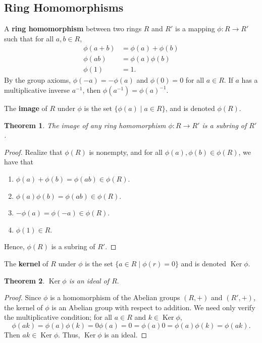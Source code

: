 \documentclass[11pt]{article}
\newtheorem{theorem}{Theorem}
\newcommand{\Ker}{\operatorname{Ker}}
\begin{document}
\subsection{Ring Homomorphisms}

A \textbf{ring homomorphism} between two rings $R$ and $R'$ is a mapping $\phi : R \to R'$ such that for all $a, b \in R$,
\begin{align*}
	\phi(a + b) &= \phi(a) + \phi(b) \\
	   \phi(ab) &= \phi(a) \phi(b) \\
	   	\phi(1) &= 1.
\end{align*}
By the group axioms, $\phi(-a) = -\phi(a)$ and $\phi(0) = 0$ for all $a \in R$. If $a$ has a multiplicative inverse $a^{-1}$, then $\phi(a^{-1}) = \phi(a)^{-1}$.

The \textbf{image} of $R$ under $\phi$ is the set $\{ \phi(a) \mid a \in R \}$, and is denoted $\phi(R)$.

\begin{adjustwidth}{0.5cm}{}
	\begin{theorem}
		The image of any ring homomorphism $\phi : R \to R'$ is a subring of $R'$.
	\end{theorem}
	\begin{proof}
		Realize that $\phi(R)$ is nonempty, and for all $\phi(a), \phi(b) \in \phi(R)$, we have that 
		\begin{enumerate}
			\item $\phi(a) + \phi(b) = \phi(ab) \in \phi(R)$.
			\item $\phi(a) \phi(b) = \phi(ab) \in \phi(R)$.
			\item $-\phi(a) = \phi(-a) \in \phi(R)$.
			\item $\phi(1) \in R$.
		\end{enumerate}	
		Hence, $\phi(R)$ is a subring of $R'$.
	\end{proof}
\end{adjustwidth}

\newpage

The \textbf{kernel} of $R$ under $\phi$ is the set $\{ a \in R\mid \phi(r) = 0 \}$ and is denoted $\Ker \phi$.

\begin{adjustwidth}{0.5cm}{}
	\begin{theorem}
		$\Ker \phi$ is an ideal of $R.$
	\end{theorem}
	\begin{proof}
		Since $\phi$ is a homomorphism of the Abelian groups $(R, +)$ and $(R', +)$, the kernel of $\phi$ is an Abelian group with respect to addition. We need only verify the multiplicative condition; for all $a \in R$ and $k \in \Ker \phi$,
		\[
			\phi(ak) = \phi(a) \phi(k) = 0 \phi(a) = 0 = \phi(a) 0 = \phi(a) \phi(k) = \phi(ak).
		\]
		Then $ak \in \Ker \phi$. Thus, $\Ker \phi$ is an ideal.
	\end{proof}
\end{adjustwidth}
\end{document}
